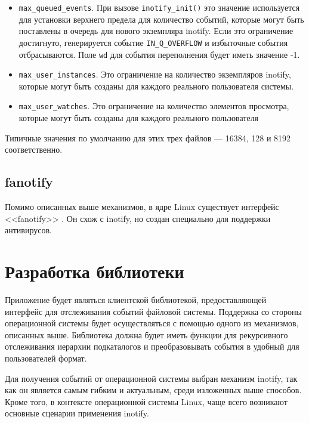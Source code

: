 \documentclass[14pt, russian]{scrartcl}
\newcommand{\code}[1]{\texttt{#1}}
\begin{document}
\begin{itemize}
  \item \code{max\_queued\_events}. При вызове \code{inotify\_init()} это
        значение используется для установки верхнего предела для количество
        событий, которые могут быть поставлены в очередь для нового экземпляра
        inotify. Если это ограничение достигнуто, генерируется событие
        \code{IN\_Q\_OVERFLOW} и избыточные события отбрасываются. Поле
        \code{wd} для события переполнения будет иметь значение -1.
  \item \code{max\_user\_instances}. Это ограничение на количество экземпляров
        inotify, которые могут быть созданы для каждого реального пользователя
        системы.
  \item \code{max\_user\_watches}. Это ограничение на количество элементов
        просмотра, которые могут быть созданы для каждого реального пользователя
\end{itemize}

Типичные значения по умолчанию для этих трех файлов --- 16384, 128 и 8192
соответственно.

\subsection{fanotify}

Помимо описанных выше механизмов, в ядре Linux существует интерфейс <<fanotify>>
\cite{fanotify}. Он схож с inotify, но создан специально для поддержки
антивирусов.

\section{Разработка библиотеки}

Приложение будет являться клиентской библиотекой, предоставляющей интерфейс для
отслеживания событий файловой системы. Поддержка со стороны операционной системы
будет осуществляться с помощью одного из механизмов, описанных выше. Библиотека
должна будет иметь функции для рекурсивного отслеживания иерархии подкаталогов и
преобразовывать события в удобный для пользователей формат.

Для получения событий от операционной системы выбран механизм inotify, так как
он является самым гибким и актуальным, среди изложенных выше способов. Кроме
того, в контексте операционной системы Linux, чаще всего возникают основные
сценарии применения inotify.

\end{document}
